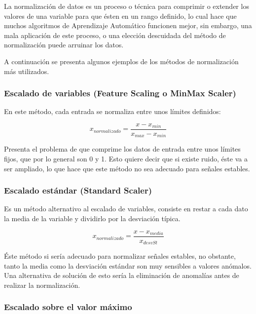 La normalizaci\'{o}n de datos es un proceso o t\'{e}cnica para comprimir o extender los valores de una variable para que \'{e}sten en un rango definido, lo cual hace que muchos algoritmos de Aprendizaje Autom\'{a}tico funcionen mejor, sin embargo, una mala aplicaci\'{o}n de este proceso, o una elecci\'{o}n descuidada del m\'{e}todo de normalizaci\'{o}n puede arruinar los datos.

\vspace{5mm} %

A continuaci\'{o}n se presenta algunos ejemplos de los m\'{e}todos de normalizaci\'{o}n m\'{a}s utilizados.

\subsubsection{Escalado de variables (Feature Scaling o MinMax Scaler)}

En este m\'{e}todo, cada entrada se normaliza entre unos l\'{i}mites definidos:

\begin{equation}
x_{normalizado} = \frac{x - x_{min}}{x_{max}-x_{min}}
\end{equation}

Presenta el problema de que comprime los datos de entrada entre unos límites fijos, que por lo general son 0 y 1. Esto quiere decir que si existe ruido, éste va a ser ampliado, lo que hace que este m\'{e}todo no sea adecuado para señales estables.

\subsubsection{Escalado est\'{a}ndar (Standard Scaler)}

Es un m\'{e}todo alternativo al escalado de variables, consiste en restar a cada dato la media de la variable y dividirlo por la desviaci\'{o}n t\'{i}pica.

\begin{equation}
x_{normalizado} = \frac{x - x_{media}}{x_{desvSt}}
\end{equation}

\'{E}ste m\'{e}todo si ser\'{i}a adecuado para normalizar se\~{n}ales estables, no obstante, tanto la media como la desviaci\'{o}n est\'{a}ndar son muy sensibles a valores an\'{o}malos. Una alternativa de soluci\'{o}n de esto ser\'{i}a la eliminaci\'{o}n de anomal\'{i}as antes de realizar la normalizaci\'{o}n.

\subsubsection{Escalado sobre el valor m\'{a}ximo}

